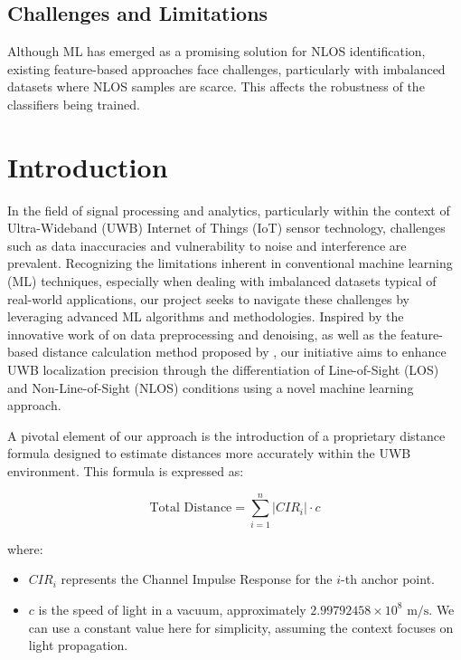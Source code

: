 \subsection{Challenges and Limitations}\label{Challenges and Limitations}
Although ML has emerged as a promising solution for NLOS identification, existing feature-based approaches face challenges, particularly with imbalanced datasets where NLOS samples are scarce. This affects the robustness of the classifiers being trained.


\section{Introduction}\label{introduction}
In the field of signal processing and analytics, particularly within the context of Ultra-Wideband (UWB) Internet of Things (IoT) sensor technology, challenges such as data inaccuracies and vulnerability to noise and interference are prevalent. Recognizing the limitations inherent in conventional machine learning (ML) techniques, especially when dealing with imbalanced datasets typical of real-world applications, our project seeks to navigate these challenges by leveraging advanced ML algorithms and methodologies. Inspired by the innovative work of \cite{jiang_uwb_2020} on data preprocessing and denoising, as well as the feature-based distance calculation method proposed by \cite{che_feature-based_2022}, our initiative aims to enhance UWB localization precision through the differentiation of Line-of-Sight (LOS) and Non-Line-of-Sight (NLOS) conditions using a novel machine learning approach.

A pivotal element of our approach is the introduction of a proprietary distance formula designed to estimate distances more accurately within the UWB environment. This formula is expressed as:

\begin{equation}
\text{Total Distance} = \sum_{i=1}^{n} |CIR_i| \cdot c
\end{equation}

where:

\begin{itemize}
  \item $CIR_i$ represents the Channel Impulse Response for the $i$-th anchor point.
  \item $c$ is the speed of light in a vacuum, approximately $2.99792458 \times 10^8 \text{ m/s}$. We can use a constant value here for simplicity, assuming the context focuses on light propagation.
\end{itemize}

